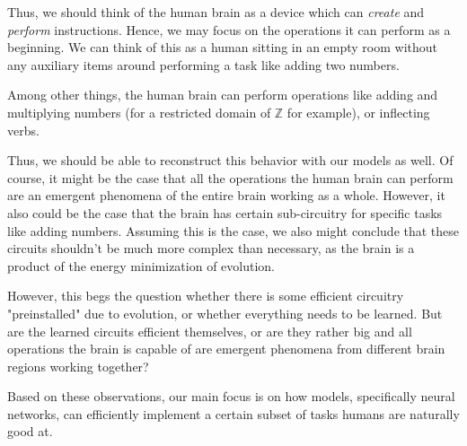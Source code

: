 \documentclass[../../main.tex]{subfiles}
\begin{document}
    Thus, we should think of the human brain as a device which can \emph{create} and \emph{perform} instructions. Hence, we may focus on the operations it can perform as a beginning. We can think of this as a human sitting in an empty room without any auxiliary items around performing a task like adding two numbers.

    \begin{premise}
        Among other things, the human brain can perform operations like adding and multiplying numbers (for a restricted domain of $\mathbb{Z}$ for example), or inflecting verbs.
    \end{premise}

    Thus, we should be able to reconstruct this behavior with our models as well. Of course, it might be the case that all the operations the human brain can perform are an emergent phenomena of the entire brain working as a whole. However, it also could be the case that the brain has certain sub-circuitry for specific tasks like adding numbers. Assuming this is the case, we also might conclude that these circuits shouldn't be much more complex than necessary, as the brain is a product of the energy minimization of evolution.

    \begin{remark}
        However, this begs the question whether there is some efficient circuitry "preinstalled" due to evolution, or whether everything needs to be learned. But are the learned circuits efficient themselves, or are they rather big and all operations the brain is capable of are emergent phenomena from different brain regions working together?
    \end{remark}

    Based on these observations, our main focus is on how models, specifically neural networks, can efficiently implement a certain subset of tasks humans are naturally good at.
\end{document}
